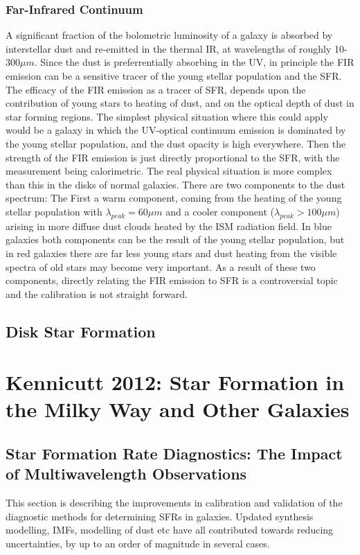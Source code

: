 \documentclass{literature}
\begin{document}
\subsubsection{Far-Infrared Continuum}
A significant fraction of the bolometric luminosity of a galaxy is absorbed by interstellar dust and re-emitted in the thermal IR, at wavelengths of roughly 10-300$\mu m$. Since the dust is preferrentially absorbing in the UV, in principle the FIR emission can be a sensitive tracer of the young stellar population and the SFR. The efficacy of the FIR emission as a tracer of SFR, depends upon the contribution of young stars to heating of dust, and on the optical depth of dust in star forming regions. The simplest physical situation where this could apply would be a galaxy in which the UV-optical continuum emission is dominated by the young stellar population, and the dust opacity is high everywhere. Then the strength of the FIR emission is just directly proportional to the SFR, with the measurement being calorimetric. The real physical situation is more complex than this in the disks of normal galaxies. There are two components to the dust spectrum: The First a warm component, coming from the heating of the young stellar population with $\lambda _{peak} = 60\mu m$ and a cooler component ($\lambda _{peak} > 100\mu m$) arising in more diffuse dust clouds heated by the ISM radiation field. In blue galaxies both components can be the result of the young stellar population, but in red galaxies there are far less young stars and dust heating from the visible spectra of old stars may become very important. As a result of these two components, directly relating the FIR emission to SFR is a controversial topic and the calibration is not straight forward.
\subsection{Disk Star Formation}







\section{Kennicutt 2012: Star Formation in the Milky Way and Other Galaxies}
\subsection{Star Formation Rate Diagnostics: The Impact of Multiwavelength Observations}
This section is describing the improvements in calibration and validation of the diagnostic methods for determining SFRs in galaxies. Updated synthesis modelling, IMFs, modelling of dust etc have all contributed towards reducing uncertainties, by up to an order of magnitude in several cases.
\end{document}

